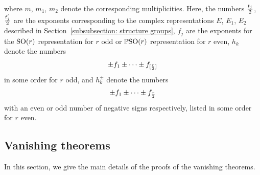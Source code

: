 \documentclass[10pt,a4paper]{amsart}
\numberwithin{equation}{section}
\begin{document}
where $m$, $m_1$, $m_2$ denote the corresponding multiplicities. Here, the numbers ${t_j\over 2}$, ${t_j'\over 2}$ are the exponents corresponding to the complex representations $E$, $E_1$, $E_2$ described in Section~\ref{subsubsection: structure groups}, $f_j$ are the exponents for the ${\rm SO}(r)$ representation for $r$ odd or $\mathbb{P}{\rm SO}(r)$ representation for $r$ even, $h_k$ denote the numbers
\begin{gather*} \pm f_1\pm\cdots \pm f_{[{r\over 2}]}\end{gather*}
in some order for $r$ odd, and $h_k^\pm$ denote the numbers
\begin{gather*} \pm f_1\pm\cdots \pm f_{r\over 2}\end{gather*}
with an even or odd number of negative signs respectively, listed in some order for $r$ even.

\subsection{Vanishing theorems}

In this section, we give the main details of the proofs of the vanishing theorems.
\end{document}
